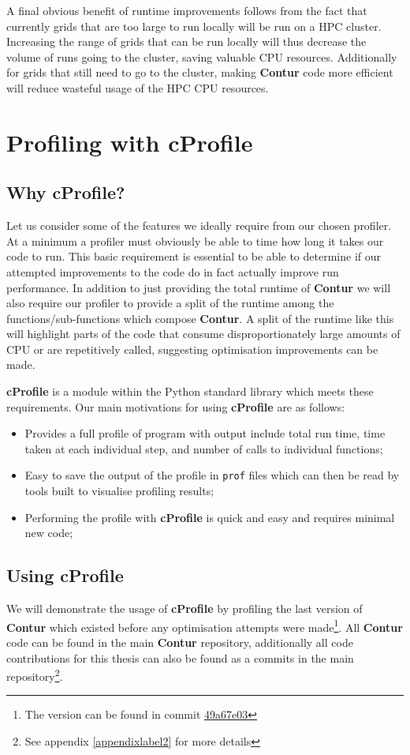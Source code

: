 A final obvious benefit of runtime improvements follows from the fact that currently grids that are too large to run locally will be run on a HPC cluster. Increasing the range of grids that can be run locally will thus decrease the volume of runs going to the cluster, saving valuable CPU resources. Additionally for grids that still need to go to the cluster, making \textbf{Contur} code more efficient will reduce wasteful usage of the HPC CPU resources.

\section{Profiling with cProfile}

\subsection{Why cProfile?}
Let us consider some of the features we ideally require from our chosen profiler. At a minimum a profiler must obviously be able to time how long it takes our code to run. This basic requirement is essential to be able to determine if our attempted improvements to the code do in fact actually improve run performance. In addition to just providing the total runtime of \textbf{Contur} we will also require our profiler to provide a split of the runtime among the functions/sub-functions which compose \textbf{Contur}. A split of the runtime like this will highlight parts of the code that consume disproportionately large amounts of CPU or are repetitively called, suggesting optimisation improvements can be made.

\textbf{cProfile}\cite{cProfile} is a module within the Python standard library which meets these requirements. Our main motivations for using \textbf{cProfile} are as follows:

\begin{itemize}
\item Provides a full profile of program with output include total run time, time taken at each individual step, and number of calls to individual functions;
\item Easy to save the output of the profile in \texttt{prof} files which can then be read by tools built to visualise profiling results;
\item Performing the profile with \textbf{cProfile} is quick and easy and requires minimal new code;
\end{itemize}

\subsection{Using cProfile}
We will demonstrate the usage of \textbf{cProfile} by profiling the last version of \textbf{Contur} which existed before any optimisation attempts were made\footnote{The version can be found in commit \href{https://gitlab.com/hepcedar/contur/-/tree/49a67e039cf93c88b39dade3dfb7c5f03e780fb2}{49a67e03}}. All \textbf{Contur} code can be found in the main \textbf{Contur} repository\cite{contur_main}, additionally all code contributions for this thesis can also be found as a commits in the main repository\footnote{See appendix \ref{appendixlabel2} for more details}. 

